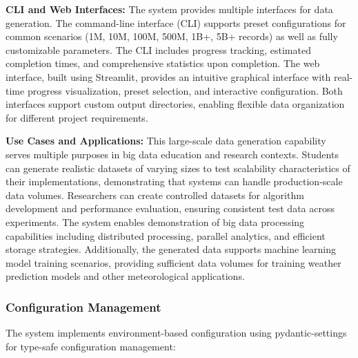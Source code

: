 \documentclass[12pt,a4paper]{article}
\begin{document}
\textbf{CLI and Web Interfaces:} The system provides multiple interfaces for data generation. The command-line interface (CLI) supports preset configurations for common scenarios (1M, 10M, 100M, 500M, 1B+, 5B+ records) as well as fully customizable parameters. The CLI includes progress tracking, estimated completion times, and comprehensive statistics upon completion. The web interface, built using Streamlit, provides an intuitive graphical interface with real-time progress visualization, preset selection, and interactive configuration. Both interfaces support custom output directories, enabling flexible data organization for different project requirements.

\textbf{Use Cases and Applications:} This large-scale data generation capability serves multiple purposes in big data education and research contexts. Students can generate realistic datasets of varying sizes to test scalability characteristics of their implementations, demonstrating that systems can handle production-scale data volumes. Researchers can create controlled datasets for algorithm development and performance evaluation, ensuring consistent test data across experiments. The system enables demonstration of big data processing capabilities including distributed processing, parallel analytics, and efficient storage strategies. Additionally, the generated data supports machine learning model training scenarios, providing sufficient data volumes for training weather prediction models and other meteorological applications.

\subsubsection{Configuration Management}

The system implements environment-based configuration using pydantic-settings for type-safe configuration management:
\end{document}
